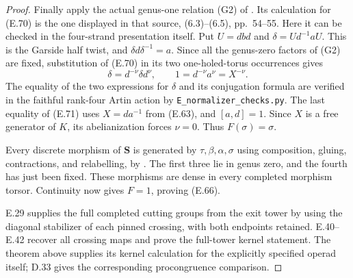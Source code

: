 \begin{proof}
Finally apply the actual genus-one relation
(G2) of \cite[Theorem 3.18]{ET_BonattoRobertson2026}.
Its calculation for (E.70) is the one displayed
in that source, (6.3)--(6.5), pp.~54--55.
Here it can be checked in the four-strand
presentation itself.  Put
$U=dbd$ and $\delta=Ud^{-1}aU$.
This is the Garside half twist, and
$\delta d\delta^{-1}=a$.
Since all the genus-zero factors of (G2) are
fixed, substitution of (E.70) in its two
one-holed-torus occurrences gives
\[
              \delta=d^{-\nu}\delta d^\nu,
       \qquad 1=d^{-\nu}a^\nu=X^{-\nu}.                 \tag{E.71}
\]
The equality of the two expressions for
$\delta$ and its conjugation formula are
verified in the faithful rank-four Artin action
by \texttt{E\_normalizer\_checks.py}.
The last equality of (E.71) uses $X=da^{-1}$
from (E.63), and $[a,d]=1$.
Since $X$ is a free generator of $K$, its
abelianization forces $\nu=0$.
Thus $F(\sigma)=\sigma$.

Every discrete morphism of $\mathbf S$ is
generated by $\tau,\beta,\alpha,\sigma$ using
composition, gluing, contractions, and
relabelling, by
\cite[Proposition 3.8 and its proof]{ET_BonattoRobertson2026}.
The first three lie in genus zero, and the
fourth has just been fixed.  These morphisms
are dense in every completed morphism torsor.
Continuity now gives $F=1$, proving (E.66).

E.29 supplies the full completed cutting groups
from the exit tower by using the diagonal
stabilizer of each pinned crossing, with both
endpoints retained. E.40--E.42 recover all
crossing maps and prove the full-tower kernel
statement. The theorem above supplies its
kernel calculation for the explicitly specified
operad itself; D.33 gives the corresponding
procongruence comparison.
\end{proof}

